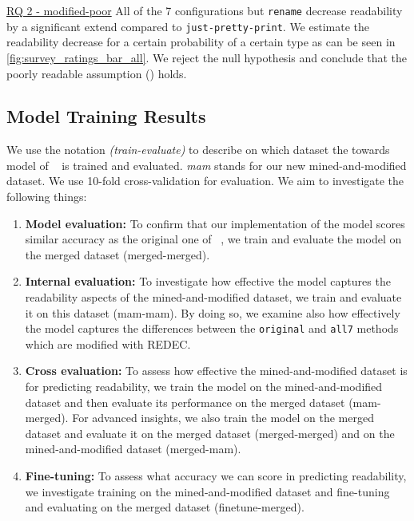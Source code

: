 \documentclass[%
class=scrreprt,
chapterprefix=false,%
open=right,%
twoside=false,%
paper=a4,%
logofile={Logo\_zentral\_farbig\_EN.png},%
thesistype=master,%
UKenglish,%
]{se2thesis}
\theoremstyle{definition}
\newcommand{\rdh}{REDEC\xspace}
\newcommand{\none}{just-pretty-print\xspace} %
\newcommand{\nonet}{\texttt{\none}\xspace} %
\begin{document}
	\begin{summary}{\hyperref[modified-poor]{RQ 2 - modified-poor}}
		All of the 7 configurations but \texttt{rename} decrease readability by a significant extend compared to \nonet. We estimate the readability decrease for a certain probability of a certain type as can be seen in \autoref{fig:survey_ratings_bar_all}. We reject the null hypothesis and conclude that the poorly readable assumption () holds.
	\end{summary}

\subsection{Model Training Results} \label{Model training results}
	We use the notation \textit{(train-evaluate)} to describe on which dataset the towards model of \citeauthor{mi2022towards}~\cite{mi2022towards} is trained and evaluated. \textit{mam} stands for our new mined-and-modified dataset. We use 10-fold cross-validation for evaluation.
	We aim to investigate the following things:
	
	\begin{enumerate}
		\item \textbf{Model evaluation:}
		To confirm that our implementation of the model scores similar accuracy as the original one of \citeauthor{mi2022towards}~\cite{mi2022towards}, we train and evaluate the model on the merged dataset (merged-merged).
		
		\item \textbf{Internal evaluation:} 
		To investigate how effective the model captures the readability aspects of the mined-and-modified dataset, we train and evaluate it on this dataset (mam-mam). By doing so, we examine also how effectively the model captures the differences between the \texttt{original} and \texttt{all7} methods which are modified with \rdh.
		
		\item \textbf{Cross evaluation:} 
		To assess how effective the mined-and-modified dataset is for predicting readability, we train the model on the mined-and-modified dataset and then evaluate its performance on the merged dataset (mam-merged). For advanced insights, we also train the model on the merged dataset and evaluate it on the merged dataset (merged-merged) and on the mined-and-modified dataset (merged-mam).
		
		\item \textbf{Fine-tuning:} 
		To assess what accuracy we can score in predicting readability, we investigate training on the mined-and-modified dataset and fine-tuning and evaluating on the merged dataset (finetune-merged).		
		
	\end{enumerate}
	
\end{document}
